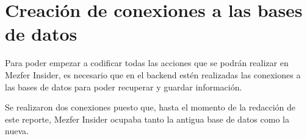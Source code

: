 \section{Creación de conexiones a las bases de datos}
Para poder empezar a codificar todas las acciones que se podrán realizar en Mezfer Insider, es necesario que en el backend estén realizadas las conexiones a las bases de datos para poder recuperar y guardar información.

Se realizaron dos conexiones puesto que, hasta el momento de la redacción de este reporte, Mezfer Insider ocupaba tanto la antigua base de datos como la nueva.
    
    